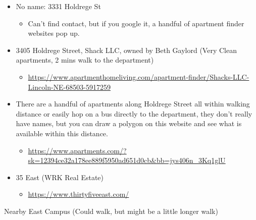 \documentclass[
  12pt,
]{book}
\providecommand{\tightlist}{%
  \setlength{\itemsep}{0pt}\setlength{\parskip}{0pt}}
\begin{document}
\begin{itemize}
\tightlist
\item
  No name: 3331 Holdrege St

  \begin{itemize}
  \tightlist
  \item
    Can't find contact, but if you google it, a handful of apartment finder websites pop up.
  \end{itemize}
\item
  3405 Holdrege Street, Shack LLC, owned by Beth Gaylord (Very Clean apartments, 2 mins walk to the department)

  \begin{itemize}
  \tightlist
  \item
    \url{https://www.apartmenthomeliving.com/apartment-finder/Shacks-LLC-Lincoln-NE-68503-5917259}
  \end{itemize}
\item
  There are a handful of apartments along Holdrege Street all within walking distance or easily hop on a bus directly to the department, they don't really have names, but you can draw a polygon on this website and see what is available within this distance.

  \begin{itemize}
  \tightlist
  \item
    \url{https://www.apartments.com/?sk=12394ce32a178ee889f5950ad651d0cb\&bb=jys406n_3Kq1glU}
  \end{itemize}
\item
  35 East (WRK Real Estate)

  \begin{itemize}
  \tightlist
  \item
    \url{https://www.thirtyfiveeast.com/}
  \end{itemize}
\end{itemize}

Nearby East Campus (Could walk, but might be a little longer walk)
\end{document}
